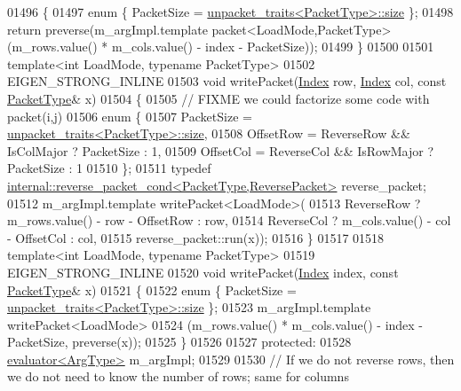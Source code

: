 \begin{DoxyCode}
01496 \textcolor{keyword}{  }\{
01497     \textcolor{keyword}{enum} \{ PacketSize = \hyperlink{struct_eigen_1_1internal_1_1unpacket__traits}{unpacket\_traits<PacketType>::size} \};
01498     \textcolor{keywordflow}{return} preverse(m\_argImpl.template packet<LoadMode,PacketType>(m\_rows.value() * m\_cols.value() - index 
      - PacketSize));
01499   \}
01500 
01501   \textcolor{keyword}{template}<\textcolor{keywordtype}{int} LoadMode, \textcolor{keyword}{typename} PacketType>
01502   EIGEN\_STRONG\_INLINE
01503   \textcolor{keywordtype}{void} writePacket(\hyperlink{namespace_eigen_a62e77e0933482dafde8fe197d9a2cfde}{Index} row, \hyperlink{namespace_eigen_a62e77e0933482dafde8fe197d9a2cfde}{Index} col, \textcolor{keyword}{const} \hyperlink{struct_eigen_1_1_packet_type}{PacketType}& x)
01504   \{
01505     \textcolor{comment}{// FIXME we could factorize some code with packet(i,j)}
01506     \textcolor{keyword}{enum} \{
01507       PacketSize = \hyperlink{struct_eigen_1_1internal_1_1unpacket__traits}{unpacket\_traits<PacketType>::size},
01508       OffsetRow  = ReverseRow && IsColMajor ? PacketSize : 1,
01509       OffsetCol  = ReverseCol && IsRowMajor ? PacketSize : 1
01510     \};
01511     \textcolor{keyword}{typedef} \hyperlink{struct_eigen_1_1internal_1_1reverse__packet__cond}{internal::reverse\_packet\_cond<PacketType,ReversePacket>}
       reverse\_packet;
01512     m\_argImpl.template writePacket<LoadMode>(
01513                                   ReverseRow ? m\_rows.value() - row - OffsetRow : row,
01514                                   ReverseCol ? m\_cols.value() - col - OffsetCol : col,
01515                                   reverse\_packet::run(x));
01516   \}
01517 
01518   \textcolor{keyword}{template}<\textcolor{keywordtype}{int} LoadMode, \textcolor{keyword}{typename} PacketType>
01519   EIGEN\_STRONG\_INLINE
01520   \textcolor{keywordtype}{void} writePacket(\hyperlink{namespace_eigen_a62e77e0933482dafde8fe197d9a2cfde}{Index} index, \textcolor{keyword}{const} \hyperlink{struct_eigen_1_1_packet_type}{PacketType}& x)
01521   \{
01522     \textcolor{keyword}{enum} \{ PacketSize = \hyperlink{struct_eigen_1_1internal_1_1unpacket__traits}{unpacket\_traits<PacketType>::size} \};
01523     m\_argImpl.template writePacket<LoadMode>
01524       (m\_rows.value() * m\_cols.value() - index - PacketSize, preverse(x));
01525   \}
01526  
01527 \textcolor{keyword}{protected}:
01528   \hyperlink{struct_eigen_1_1internal_1_1evaluator}{evaluator<ArgType>} m\_argImpl;
01529 
01530   \textcolor{comment}{// If we do not reverse rows, then we do not need to know the number of rows; same for columns}

\end{DoxyCode}
